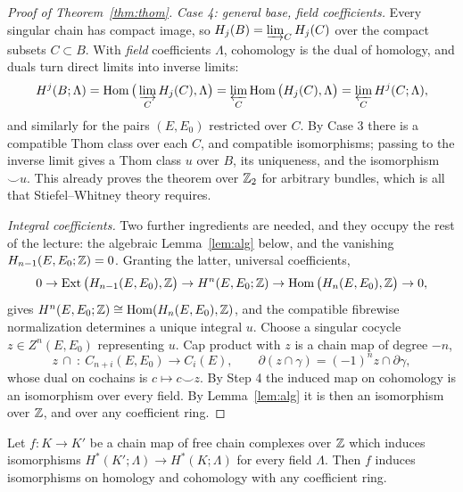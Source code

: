 \begin{proof}[Proof of Theorem~\ref{thm:thom}]
 \emph{Case 4: general base, field coefficients.} Every singular chain
has compact image, so
$H_j(B)=\varinjlim_C H_j(C)$ over the compact subsets $C\subset B$. With
\emph{field} coefficients $\Lambda$, cohomology is the dual of homology, and
duals turn direct limits into inverse limits:
\[
H^j(B;\Lambda)=\operatorname{Hom}\big(\varinjlim_C H_j(C),\Lambda\big)
=\varprojlim_C\operatorname{Hom}\big(H_j(C),\Lambda\big)=\varprojlim_C H^j(C;\Lambda),
\]
and similarly for the pairs $(E,E_0)$ restricted over $C$. By Case 3 there is a
compatible Thom class over each $C$, and compatible isomorphisms; passing to the
inverse limit gives a Thom class $u$ over $B$, its uniqueness, and the
isomorphism $\smile u$. This already proves the theorem over $\mathbb{Z}_2$ for
arbitrary bundles, which is all that Stiefel--Whitney theory requires.

 \emph{Integral coefficients.} Two further ingredients are needed, and
they occupy the rest of the lecture: the algebraic Lemma~\ref{lem:alg} below,
and the vanishing $H_{n-1}(E,E_0;\mathbb{Z})=0$. Granting the latter, universal
coefficients,
\[
0\to\operatorname{Ext}\big(H_{n-1}(E,E_0),\mathbb{Z}\big)\to H^n(E,E_0;\mathbb{Z})\to
\operatorname{Hom}\big(H_n(E,E_0),\mathbb{Z}\big)\to0,
\]
gives $H^n(E,E_0;\mathbb{Z})\cong\operatorname{Hom}(H_n(E,E_0),\mathbb{Z})$, and the compatible fibrewise
normalization determines a unique integral $u$. Choose a singular cocycle
$z\in Z^n(E,E_0)$ representing $u$. Cap product with $z$ is a chain map of
degree $-n$,
\[
z\,\cap\ \colon\ C_{n+i}(E,E_0)\longrightarrow C_i(E),
\qquad
\partial(z\cap\gamma)=(-1)^n z\cap\partial\gamma,
\]
whose dual on cochains is $c\mapsto c\smile z$. By Step 4 the induced map on
cohomology is an isomorphism over every field. By Lemma~\ref{lem:alg} it is then
an isomorphism over $\mathbb{Z}$, and over any coefficient ring.
\end{proof}

\begin{lemma}\label{lem:alg}
Let $f\colon K\to K'$ be a chain map of free chain complexes over $\mathbb{Z}$ which
induces isomorphisms $H^*(K';\Lambda)\to H^*(K;\Lambda)$ for every field
$\Lambda$. Then $f$ induces isomorphisms on homology and cohomology with any
coefficient ring.
\end{lemma}

